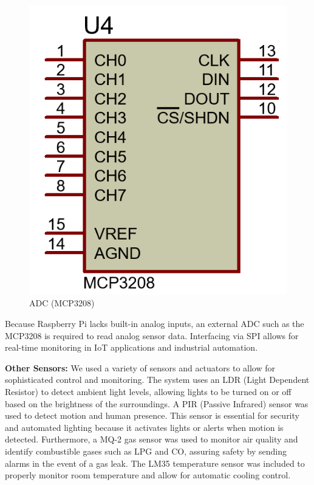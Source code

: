 \documentclass[a4paper,12pt]{report}
\begin{document}
\begin{figure}[H]  %
    \centering
    \includegraphics[scale=0.4]{MCP3208.PNG} %
    \caption{ADC (MCP3208)}
    \label{fig:adc} %
\end{figure}

Because Raspberry Pi lacks built-in analog inputs, an external ADC such as the MCP3208 is required to read analog sensor data.  Interfacing via SPI allows for real-time monitoring in IoT applications and industrial automation\cite{Flurry2021}.

\textbf{Other Sensors:} We used a variety of sensors and actuators to allow for sophisticated control and monitoring.  The system uses an LDR (Light Dependent Resistor) to detect ambient light levels, allowing lights to be turned on or off based on the brightness of the surroundings. 
A PIR (Passive Infrared) sensor was used to detect motion and human presence.  This sensor is essential for security and automated lighting because it activates lights or alerts when motion is detected.  Furthermore, a MQ-2 gas sensor was used to monitor air quality and identify combustible gases such as LPG and CO, assuring safety by sending alarms in the event of a gas leak.  The LM35 temperature sensor was included to properly monitor room temperature and allow for automatic cooling control.
\end{document}
